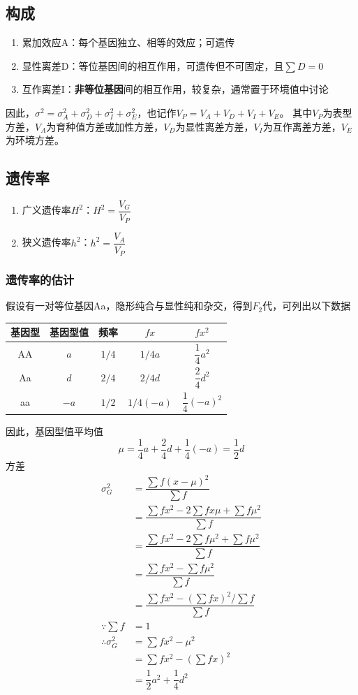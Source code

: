 \documentclass[a4paper, 12pt]{report}
\begin{document}
  \subsection{构成}
  \begin{enumerate}
    \item 累加效应A：每个基因独立、相等的效应；可遗传
    \item 显性离差D：等位基因间的相互作用，可遗传但不可固定，且$\sum D=0$
    \item 互作离差I：\textbf{非等位基因}间的相互作用，较复杂，通常置于环境值中讨论
  \end{enumerate}
  因此，$\sigma^2 = \sigma^2_A + \sigma^2_D + \sigma^2_I + \sigma^2_E$，也记作$V_P = V_A + V_D + V_I + V_E$。
  其中$V_P$为表型方差，$V_A$为育种值方差或加性方差，$V_D$为显性离差方差，$V_I$为互作离差方差，$V_E$为环境方差。
  \subsection{遗传率}
  \begin{enumerate}
    \item 广义遗传率$H^2$：$H^2 = \dfrac{V_G}{V_P}$
    \item 狭义遗传率$h^2$：$h^2 = \dfrac{V_A}{V_P}$
  \end{enumerate}
  \subsubsection{遗传率的估计}
  假设有一对等位基因Aa，隐形纯合与显性纯和杂交，得到$F_2$代，可列出以下数据
  \begin{center}
    \begin{tabular}{ccccc}
      基因型&基因型值&频率&$fx$&$fx^2$\\
      \hline
      AA&$a$&$1/4$&$1/4a$&$\dfrac{1}{4}a^2$\\
      Aa&$d$&$2/4$&$2/4d$&$\dfrac{2}{4}d^2$\\
      aa&$-a$&$1/2$&$1/4(-a)$&$\dfrac{1}{4}(-a)^2$\\
    \end{tabular}
  \end{center}
  因此，基因型值平均值$$\mu=\dfrac{1}{4}a+\dfrac{2}{4}d+\dfrac{1}{4}(-a)=\dfrac{1}{2}d$$
  方差
  \[
  \begin{aligned}
    \sigma_G^2&=\dfrac{\sum f(x-\mu)^2}{\sum f}\\
    &=\dfrac{\sum fx^2-2\sum fx\mu+\sum f\mu^2}{\sum f}\\
    &=\dfrac{\sum fx^2-2\sum f\mu^2+\sum f\mu^2}{\sum f}\\
    &=\dfrac{\sum fx^2-\sum f\mu^2}{\sum f}\\
    &=\dfrac{\sum fx^2-(\sum fx)^2/\sum f}{\sum f}\\
    \because \sum f&=1\\
    \therefore \sigma_G^2&=\sum fx^2-\mu^2\\
    &=\sum fx^2-(\sum fx)^2\\
    &=\dfrac12a^2+\dfrac14d^2\\
  \end{aligned}
  \]
\end{document}
